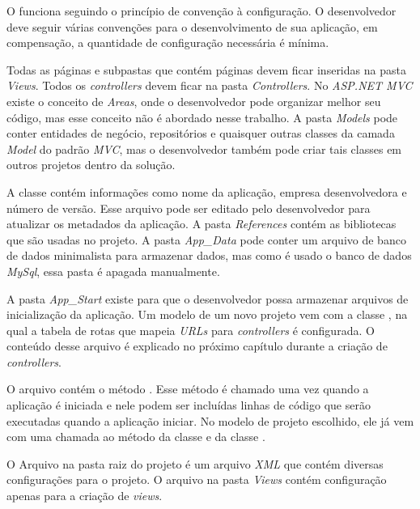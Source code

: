 
O \anmvc funciona seguindo o princípio de convenção à configuração. O desenvolvedor deve seguir várias convenções para o desenvolvimento de sua aplicação, em compensação, a quantidade de configuração necessária é mínima.

Todas as páginas e subpastas que contém páginas devem ficar inseridas na pasta \textit{Views}. Todos os \textit{controllers} devem ficar na pasta \textit{Controllers}. No \textit{ASP.NET MVC} existe o conceito de \textit{Areas}, onde o desenvolvedor pode organizar melhor seu código, mas esse conceito não é abordado nesse trabalho. A pasta \textit{Models} pode conter entidades de negócio, repositórios e quaisquer outras classes da camada \textit{Model} do padrão \textit{MVC}, mas o desenvolvedor também pode criar tais classes em outros projetos dentro da solução.

A classe  contém informações como nome da aplicação, empresa desenvolvedora e número de versão. Esse arquivo pode ser editado pelo desenvolvedor para atualizar os metadados da aplicação. A pasta \textit{References} contém as bibliotecas que são usadas no projeto. A pasta \textit{App\_Data} pode conter um arquivo de banco de dados minimalista para armazenar dados, mas como é usado o banco de dados \textit{MySql}, essa pasta é apagada manualmente.

A pasta \textit{App\_Start} existe para que o desenvolvedor possa armazenar arquivos de inicialização da aplicação. Um modelo de um novo projeto \anmvc vem com a classe , na qual a tabela de rotas que mapeia \textit{URLs} para \textit{controllers} é configurada. O conteúdo desse arquivo é explicado no próximo capítulo durante a criação de \textit{controllers}.

O arquivo  contém o método . Esse método é chamado uma vez quando a aplicação é iniciada e nele podem ser incluídas linhas de código que serão executadas quando a aplicação iniciar. No modelo de projeto escolhido, ele já vem com uma chamada ao método  da classe  e  da classe .

O Arquivo  na pasta raiz do projeto é um arquivo \textit{XML} que contém diversas configurações para o projeto. O arquivo  na pasta \textit{Views} contém configuração apenas para a criação de \textit{views}.


